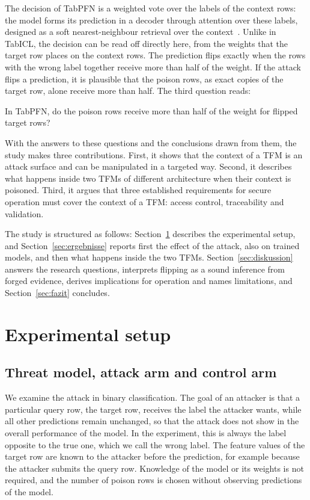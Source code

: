 \documentclass[pdflatex,sn-mathphys-num]{sn-jnl}
\newenvironment{fragen}{\begin{list}{}{\settowidth{\labelwidth}{(1a)}%
  \setlength{\leftmargin}{\dimexpr\labelwidth+\labelsep\relax}%
  \setlength{\itemsep}{1pt}\setlength{\topsep}{3pt}}}{\end{list}}
\begin{document}
The decision of TabPFN is a weighted vote over the labels of the context
rows: the model forms its prediction in a decoder through attention over
these labels, designed as a soft nearest-neighbour retrieval over the
context~\citep{grinsztajn2026}. Unlike in TabICL, the decision can be
read off directly here, from the weights that the target row places on
the context rows. The prediction flips exactly when the rows with the
wrong label together receive more than half of the weight. If the attack
flips a prediction, it is plausible that the poison rows, as exact copies
of the target row, alone receive more than half.
The third question reads:
\begin{fragen}
\item[(3)] In TabPFN, do the poison rows receive more than half of the
weight for flipped target rows?
\end{fragen}

With the answers to these questions and the conclusions drawn from them,
the study makes three contributions. First, it shows that the context of
a TFM is an attack surface and can be manipulated in a targeted way.
Second, it describes what happens inside two TFMs of different
architecture when their context is poisoned. Third, it argues that three established requirements for secure
operation must cover the context of a TFM: access control, traceability
and validation.

The study is structured as follows: Section~\ref{sec:setup} describes
the experimental setup, and Section~\ref{sec:ergebnisse} reports first
the effect of the attack, also on trained models, and then what happens
inside the two TFMs. Section~\ref{sec:diskussion} answers the research questions,
interprets flipping as a sound inference from forged evidence, derives
implications for operation and names limitations, and
Section~\ref{sec:fazit} concludes.

\section{Experimental setup}
\label{sec:setup}

\subsection{Threat model, attack arm and control arm}
\label{sec:aufbau}

We examine the attack in binary classification. The goal of an attacker
is that a particular query row, the target row, receives the label the
attacker wants, while all other predictions remain unchanged, so that
the attack does not show in the overall performance of the model. In the experiment, this is always the label opposite to the true one,
which we call the wrong label. The feature values of the target row are known
to the attacker before the prediction, for example because the attacker
submits the query row. Knowledge of the model or its weights is not
required, and the number of poison rows is chosen without observing
predictions of the model.
\end{document}
